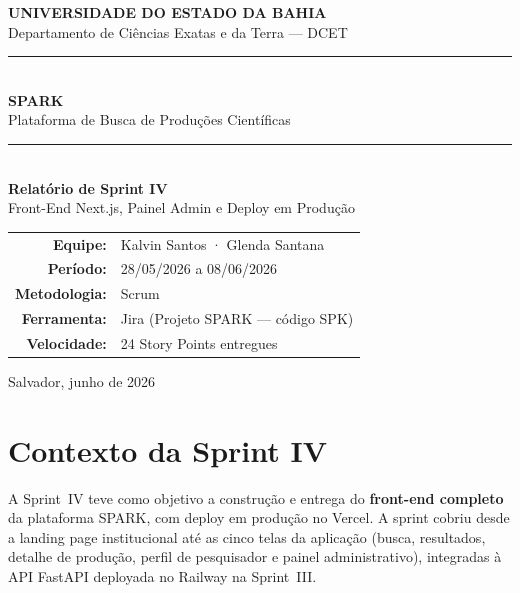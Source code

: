 \documentclass[12pt,a4paper]{article}
\begin{document}

\begin{titlepage}
  \begin{center}
    \vspace*{2cm}
    {\Large\bfseries\color{sparkblue} UNIVERSIDADE DO ESTADO DA BAHIA}\\[0.3cm]
    {\large Departamento de Ciências Exatas e da Terra — DCET}\\[2.5cm]

    \rule{\linewidth}{1.5pt}\\[0.4cm]
    {\huge\bfseries\color{sparkblue} SPARK}\\[0.2cm]
    {\large Plataforma de Busca de Produções Científicas}\\[0.2cm]
    \rule{\linewidth}{1.5pt}\\[1.5cm]

    {\LARGE\bfseries Relatório de Sprint IV}\\[0.5cm]
    {\large Front-End Next.js, Painel Admin e Deploy em Produção}\\[2cm]

    \begin{tabular}{rl}
      \textbf{Equipe:}      & Kalvin Santos \quad · \quad Glenda Santana \\[0.3cm]
      \textbf{Período:}     & 28/05/2026 a 08/06/2026 \\[0.3cm]
      \textbf{Metodologia:} & Scrum \\[0.3cm]
      \textbf{Ferramenta:}  & Jira (Projeto SPARK — código SPK) \\[0.3cm]
      \textbf{Velocidade:}  & 24 Story Points entregues \\
    \end{tabular}

    \vfill
    {\large Salvador, junho de 2026}
  \end{center}
\end{titlepage}

\tableofcontents
\newpage

\section{Contexto da Sprint IV}

A Sprint~IV teve como objetivo a construção e entrega do \textbf{front-end completo} da plataforma SPARK,
com deploy em produção no Vercel. A sprint cobriu desde a landing page institucional até as cinco telas
da aplicação (busca, resultados, detalhe de produção, perfil de pesquisador e painel administrativo),
integradas à API FastAPI deployada no Railway na Sprint~III.
\end{document}
